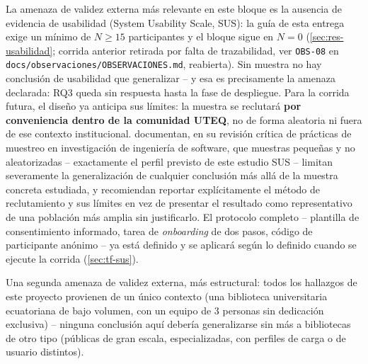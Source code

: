 La amenaza de validez externa más relevante en este bloque es la
ausencia de evidencia de usabilidad (System Usability Scale, SUS): la
guía de esta entrega exige un mínimo de $N\geq15$ participantes y el
bloque sigue en $N=0$ (\autoref{sec:res-usabilidad}; corrida anterior
retirada por falta de trazabilidad, ver \texttt{OBS-08} en
\texttt{docs/observaciones/OBSERVACIONES.md}, reabierta). Sin muestra
no hay conclusión de usabilidad que generalizar -- y esa es
precisamente la amenaza declarada: RQ3 queda sin respuesta hasta la
fase de despliegue. Para la corrida futura, el diseño ya anticipa sus
límites: la muestra se reclutará \textbf{por conveniencia dentro de la
comunidad UTEQ}, no de forma aleatoria ni fuera de ese contexto
institucional. \citet{baltes2022sampling} documentan, en su revisión
crítica de prácticas de muestreo en investigación de ingeniería de
software, que muestras pequeñas y no aleatorizadas -- exactamente el
perfil previsto de este estudio SUS -- limitan severamente la
generalización de cualquier conclusión más allá de la muestra concreta
estudiada, y recomiendan reportar explícitamente el método de
reclutamiento y sus límites en vez de presentar el resultado como
representativo de una población más amplia sin justificarlo. El
protocolo completo -- plantilla de consentimiento informado, tarea de
\emph{onboarding} de dos pasos, código de participante anónimo -- ya
está definido y se aplicará según lo definido cuando se ejecute la
corrida (\autoref{sec:tf-sus}).

Una segunda amenaza de validez externa, más estructural: todos los
hallazgos de este proyecto provienen de un único contexto (una biblioteca
universitaria ecuatoriana de bajo volumen, con un equipo de 3 personas
sin dedicación exclusiva) -- ninguna conclusión aquí debería
generalizarse sin más a bibliotecas de otro tipo (públicas de gran
escala, especializadas, con perfiles de carga o de usuario distintos).

